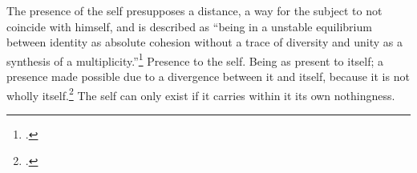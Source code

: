 The presence of the self presupposes a distance, a way for the subject to not coincide with himself, and is described as ``being in a unstable equilibrium between identity as absolute cohesion without a trace of diversity and unity as a synthesis of a multiplicity.''\footcite[101]{sartre43} Presence to the self. Being as present to itself; a presence made possible due to a divergence between it and itself, because it is not wholly itself.\footcite[This difference, or non-coincidence, is what Sartre calls \emph{nothingness} precisely because it is nothing: ``But if we ask ourselves at this point \emph{what it is} which separates the subject from himslef, we are forced to admit it is \emph{nothing}'' He further refers to it as a fissure in consciousness: ``This fissure then is the pure negative.''][101-2]{sartre43} The self can only exist if it carries within it its own nothingness.

